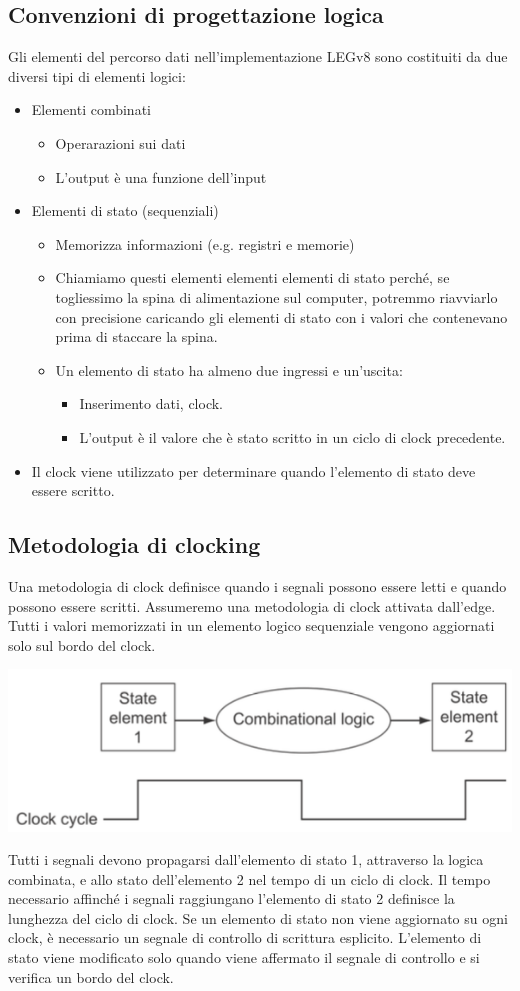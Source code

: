 \documentclass[12pt,a4paper]{article}
\begin{document}
\subsection{Convenzioni di progettazione logica}
Gli elementi del percorso dati nell'implementazione LEGv8 sono costituiti da due diversi tipi di elementi logici:
\begin{itemize}
\item Elementi combinati
\begin{itemize}
\item Operarazioni sui dati
\item L'output è una funzione dell'input
\end{itemize}
\item Elementi di stato (sequenziali)
\begin{itemize}
\item Memorizza informazioni (e.g. registri e memorie)
\item Chiamiamo questi elementi elementi elementi di stato perché, se togliessimo la spina di alimentazione sul computer, potremmo riavviarlo con precisione caricando gli elementi di stato con i valori che contenevano prima di staccare la spina.
\item Un elemento di stato ha almeno due ingressi e un'uscita:
\begin{itemize}
\item Inserimento dati, clock.
\item L'output è il valore che è stato scritto in un ciclo di clock precedente.
\end{itemize}
\end{itemize}
\item Il clock viene utilizzato per determinare quando l'elemento di stato deve essere scritto.
\end{itemize}

\subsection{Metodologia di clocking}
Una metodologia di clock definisce quando i segnali possono essere letti e quando possono essere scritti. Assumeremo una metodologia di clock attivata dall'edge. Tutti i valori memorizzati in un elemento logico sequenziale vengono aggiornati solo sul bordo del clock.
\begin{center}
\includegraphics[width=0.5\columnwidth]{img/clocking.png}
\end{center}
Tutti i segnali devono propagarsi dall'elemento di stato 1, attraverso la logica combinata, e allo stato dell'elemento 2 nel tempo di un ciclo di clock. Il tempo necessario affinché i segnali raggiungano l'elemento di stato 2 definisce la lunghezza del ciclo di clock. Se un elemento di stato non viene aggiornato su ogni clock, è necessario un segnale di controllo di scrittura esplicito. L'elemento di stato viene modificato solo quando viene affermato il segnale di controllo e si verifica un bordo del clock.
\end{document}
